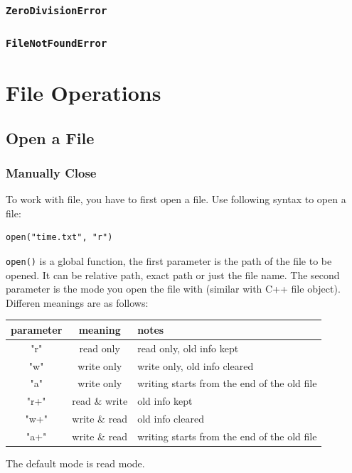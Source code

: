 \documentclass[12pt]{book}
\begin{document}
\subsection{\texttt{ZeroDivisionError}}
\label{sec:org658e661}
\subsection{\texttt{FileNotFoundError}}
\label{sec:org4b5bbbc}
\chapter{File Operations}
\label{sec:org1708f30}
\section{Open a File}
\label{sec:orgb48f114}
\subsection{Manually Close}
\label{sec:org6916e15}
To work with file, you have to first open a file. Use following syntax to open a file:
\begin{verbatim}
open("time.txt", "r")
\end{verbatim}
\texttt{open()} is a global function, the first parameter is the path of the file to be opened. It can be relative path, exact path or just the file name. The second parameter is the mode you open the file with (similar with C++ file object). Differen meanings are as follows:
\begin{center}
\begin{tabular}{ccl}
parameter & meaning & notes\\
\hline
"r" & read only & read only, old info kept\\
"w" & write only & write only, old info cleared\\
"a" & write only & writing starts from the end of the old file\\
"r+" & read \& write & old info kept\\
"w+" & write \& read & old info cleared\\
"a+" & write \& read & writing starts from the end of the old file\\
\hline
\end{tabular}
\end{center}

The default mode is read mode.
\end{document}
